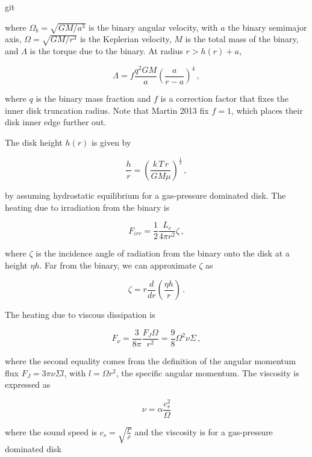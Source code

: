 git\documentclass{article}
\begin{document}
where $\Omega_b = \sqrt{G M/a^3}$ is the binary angular velocity, with $a$ the binary semimajor axis, $\Omega = \sqrt{G M/r^{3}}$ is the Keplerian velocity, $M$ is the total mass of the binary, and $\Lambda$ is the torque due to the binary. At radius $r > h(r) + a$,

\begin{equation}
\Lambda = f \frac{q^2 GM}{a} \left(\frac{a}{r-a}\right)^4\,,
\end{equation}

where $q$ is the binary mass fraction and $f$ is a correction factor that fixes the inner disk truncation radius. Note that Martin 2013 fix $f =1$, which places their disk inner edge further out. 

The disk height $h(r)$ is given by

\begin{equation}
\frac{h}{r} = \left(\frac{k\,T\,r}{G M\mu}\right)^\frac{1}{2} \,,
\end{equation}

by assuming hydrostatic equilibrium for a gas-pressure dominated disk.
The heating due to irradiation from the binary is

\begin{equation}
F_{irr} = \frac{1}{2} \frac{L_c}{4\pi r^2} \zeta\,,
\end{equation}

where $\zeta$ is the incidence angle of radiation from the binary onto the disk at a height $\eta h$. Far from the binary, we can approximate $\zeta$ as

\begin{equation}
\zeta = r \frac{d}{dr} \left(\frac{\eta h}{r}\right)\,.
\end{equation}

The heating due to viscous dissipation is

\begin{equation}
F_\nu = \frac{3}{8\pi} \frac{F_J \Omega}{r^2} = \frac{9}{8} \Omega^2 \nu \Sigma\,,
\end{equation}

where the second equality comes from the definition of the angular momentum flux $F_J = 3 \pi \nu \Sigma l$, with $l = \Omega r^2$, the specific angular momentum. The viscosity is expressed as

\begin{equation}
\nu = \alpha \frac{c_s^2}{\Omega}
\end{equation}

where the sound speed is $c_s = \sqrt{\frac{P}{\rho}}$ and the viscosity is for a gas-pressure dominated disk 
 
\end{document}
